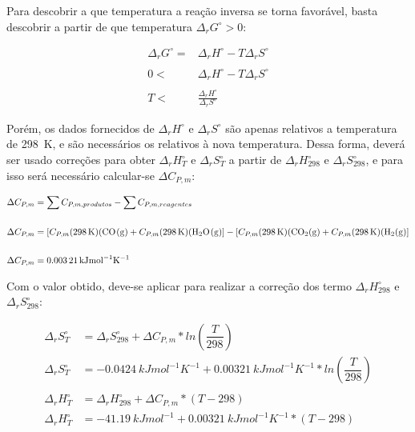 Para descobrir a que temperatura a reação inversa se torna favorável, basta descobrir a partir de que temperatura \(\Delta_r G^\circ > 0\):

\begin{align*}
	\Delta_r G^\circ = &\Delta_r H^\circ - T \Delta_r S^\circ \\ \\
	0 < &\Delta_r H^\circ - T \Delta_r S^\circ \\ \\
	T < &\frac{\Delta_r H^\circ}{\Delta_r S^\circ}
\end{align*}

Porém, os dados fornecidos de \(\Delta_r H^\circ\)  e  \(\Delta_r S^\circ\) são apenas relativos a temperatura de \qty{298}{K}, e são necessários os relativos à nova temperatura. Dessa forma, deverá ser usado correções para obter \(\Delta_r H^\circ_{T}\) e \(\Delta_r S^\circ_{T}\)  a partir de \(\Delta_r H^\circ_{298}\) e \(\Delta_r S^\circ_{298} \), e para isso será necessário calcular-se \(\Delta C_{P,m}\):

 \begin{align*}
 	\Delta C_{P,m} &= \sum C_{P,m, produtos} - \sum C_{P,m, reagentes}\\ \\
 	\Delta C_{P,m} &= [C_{P,m} (\qty{298}{K}) (\ce{CO(g)} + C_{P,m} (\qty{298}{K}) (\ce{H2O(g)}] - [ C_{P,m} (\qty{298}{K}) (\ce{CO2(g)} + C_{P,m} (\qty{298}{K}) (\ce{H2(g)}]\\ \\
 	\Delta C_{P,m} &= \qty{0,00321}{kJmol^{-1}K^{-1}}
 \end{align*}
 
Com o valor obtido, deve-se aplicar para realizar a correção dos termo \(\Delta_rH^\circ_{298}\) e \(\Delta_rS^\circ_{298} \):

\begin{align*}
	\Delta_rS^\circ_{T} &= \Delta_rS^\circ_{298} +\Delta C_{P,m} * ln (\dfrac{T}{298}) \\
	\Delta_rS^\circ_{T} &= \qty{-0,0424}{kJmol^{-1}K^{-1}} +\qty{0,00321}{kJmol^{-1}K^{-1}} * ln (\dfrac{T}{298}) \\ \\
	\Delta_rH^\circ_{T} &= \Delta_rH^\circ_{298} +\Delta C_{P,m} *  (T - 298) \\
	\Delta_rH^\circ_{T} &= \qty{-41,19}{kJmol^{-1}} +\qty{0,00321}{kJmol^{-1}K^{-1}} *  (T - 298) \\
\end{align*}

